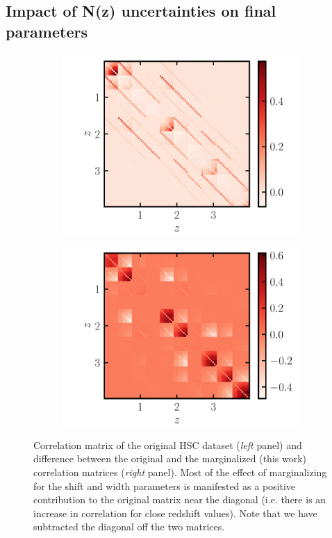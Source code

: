 \documentclass[a4paper,11pt]{article}
\begin{document}
    \subsection{Impact of N(z) uncertainties on final parameters}\label{ssec:hcs.mcmc}
      \begin{figure}
        \centering
        \begin{subfigure}{.5\textwidth}
          \centering
          \includegraphics[width=1.\linewidth]{./corr_data}
        \end{subfigure}%
        \begin{subfigure}{.5\textwidth}
          \centering
          \includegraphics[width=1.\linewidth]{./corr_diff}
        \end{subfigure}
        \caption{Correlation matrix of the original HSC dataset (\textit{left} panel) and difference between the original and the marginalized (this work) correlation matrices (\textit{right} panel). Most of the effect of marginalizing for the shift and width parameters is manifested as a positive contribution to the original matrix near the diagonal (i.e. there is an increase in correlation for close redshift values). Note that we have subtracted the diagonal off the two matrices.}\label{fig:fid_marg_cov}
      \end{figure}
\end{document}
